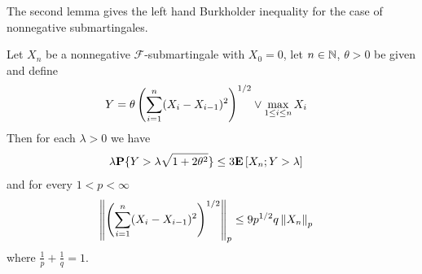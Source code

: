 The second lemma gives the left hand Burkholder inequality for the
case of nonnegative submartingales.
\begin{lem}\label{BurkholderInequalityLemma2}Let $X_n$ be a nonnegative $\mathcal{F}$-submartingale with $X_0=0$, let $n \in \mathbb{N}$, $\theta>0$ be given and define 
\begin{align*}
Y &= \theta \left( \sum_{i=1}^n (X_i-X_{i-1})^2 \right)^{1/2} \vee    \max_{1 \leq i \leq n} X_i
\end{align*}
Then for each $\lambda > 0$ we have
\begin{align*}
\lambda \textbf{P}\{Y > \lambda \sqrt{1+2\theta^2}\} &\leq 3 \textbf{E}\left[X_n ; Y > \lambda\right]
\end{align*}
and for every $1 < p < \infty$
\begin{align*}
\left \lVert \left(\sum_{i=1}^n (X_i-X_{i-1})^2 \right)^{1/2}  \right \rVert_p &\leq 9 p^{1/2} q \left \lVert X_n \right \rVert_p
\end{align*}
where $\frac{1}{p} + \frac{1}{q}=1$.
\end{lem}
